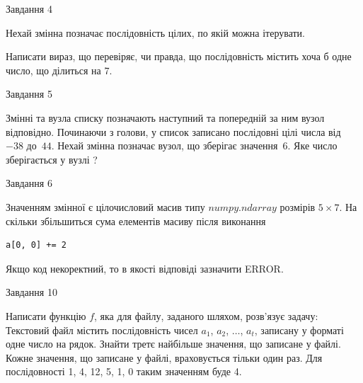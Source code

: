 \documentclass[12pt, ukrainian]{article}
\begin{document}
{\begin{minipage}[t]{8.0cm}
\end{minipage}


               
{\begin{center}Завдання {4}\end{center}}
\vspace{-4mm}
Нехай змінна  позначає послідовність цілих, по якій можна ітерувати.

Написати вираз, що перевіряє, чи правда, що послідовність  містить хоча б одне число, що ділиться на 7.\par

\vspace{10mm}
               
{\begin{center}Завдання {5}\end{center}}
\vspace{-4mm}
Змінні  та  вузла списку позначають наступний та попередній за ним вузол відповідно. Починаючи з голови, у список записано послідовні цілі числа від~$-38$ до~$44$. Нехай змінна  позначає вузол, що зберігає значення~$6$.
Яке число зберігається у вузлі  ?\par

               
{\begin{center}Завдання {6}\end{center}}
\vspace{-4mm}
Значенням змінної  є цілочисловий масив типу $numpy.ndarray$ розмірів $5{\times}7$. На скільки збільшиться сума елементів масиву  після виконання
\begin{verbatim}
a[0, 0] += 2
\end{verbatim}


Якщо код некоректний, то в якості відповіді зазначити ERROR.\par

               
{\begin{center}Завдання {10}\end{center}}
\vspace{-4mm}

Написати функцію $f$, яка для файлу, заданого шляхом, розв’язує задачу:\\ Текстовий файл містить послідовність чисел $a_1$, $a_2$, $\ldots$, $a_t$, записану у форматі одне число на рядок. Знайти третє найбільше значення, що записане у файлі. Кожне значення, що записане у файлі, враховується тільки один раз. Для послідовності 1, 4, 12, 5, 1, 0 таким значенням буде 4.

}
\end{document}
